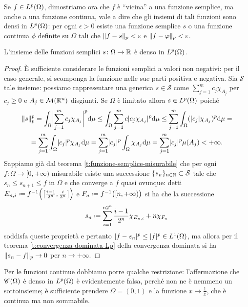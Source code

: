 Se $f\in\leb[p]{\Omega}$, dimostriamo ora che $f$ è ``vicina'' a una funzione semplice, ma anche a una funzione continua, vale a dire che gli insiemi di tali funzioni sono densi in $\leb[p]{\Omega}$: per ogni $\epsilon>0$ esiste una funzione semplice $s$ o una funzione continua $\phi$ definite su $\Omega$ tali che $\norm{f-s}_p<\epsilon$ e $\norm{f-\phi}_p<\epsilon$.
\begin{teorema} \label{t:funzioni-semplici-dense}
    L'insieme delle funzioni semplici $s\colon\Omega\to\R$ è denso in $\leb[p]{\Omega}$.
\end{teorema}
\begin{proof}
    È sufficiente considerare le funzioni semplici a valori non negativi: per il caso generale, si scomponga la funzione nelle sue parti positiva e negativa.
    Sia $\mathcal{S}$ tale insieme: possiamo rappresentare una generica $s\in\mathcal{S}$ come $\sum_{j=1}^mc_j\chi_{A_j}$ per $c_j\ge 0$ e $A_j\in\mis(\R^n)$ disgiunti.
    Se $\Omega$ è limitato allora $s\in\leb[p]{\Omega}$ poich\'e
    \begin{multline}
        \norm{s}_p^p=
        \int_\Omega\abs[\bigg]{\sum_{j=1}^mc_j\chi_{A_j}}^p\dd\mu\le
        \int_\Omega\sum_{j=1}^mc\abs{c_j\chi_{A_j}}^p\dd\mu\le
        \sum_{j=1}^m\int_\Omega(\abs{c_j}\chi_{A_j})^p\dd\mu=\\=
        \sum_{j=1}^m\int_\Omega\abs{c_j}^p\chi_{A_j}\dd\mu=
        \sum_{j=1}^m\abs{c_j}^p\int_\Omega\chi_{A_j}\dd\mu=
        \sum_{j=1}^m\abs{c_j}^p\mu(A_j)<
        +\infty.
    \end{multline}
    Sappiamo già dal teorema \ref{t:funzione-semplice-misurabile} che per ogni $f\colon\Omega\to[0,+\infty)$ misurabile esiste una successione $\{s_n\}_{n\in\N}\subset\mathcal{S}$ tale che $s_n\le s_{n+1}\le f$ in $\Omega$ e che converge a $f$ quasi ovunque: detti $E_{n,i}\defeq f^{-1}\Bigl(\bigl[\frac{i-1}{2^n},\frac{i}{2^n}\bigr]\Bigr)$ e $F_n\defeq f^{-1}\bigl([n,+\infty)\bigr)$ si ha che la successione
        \begin{equation}
            s_n\defeq\sum_{i=1}^{n2^n}\frac{i-1}{2^n}\chi_{E_{n,i}}+n\chi_{F_n}
        \end{equation}
        soddisfa queste proprietà e pertanto $\abs{f-s_n}^p\le\abs{f}^p\in\leb[1]{\Omega}$, ma allora per il teorema \ref{t:convergenza-dominata-Lp} della convergenza dominata si ha $\norm{s_n-f}_p\to 0$ per $n\to+\infty$.
\end{proof}
Per le funzioni continue dobbiamo porre qualche restrizione: l'affermazione che $\cont{\Omega}$ è denso in $\leb[p]{\Omega}$ è evidentemente falsa, perch\'e non ne è nemmeno un sottoinsieme; è sufficiente prendere $\Omega=(0,1)$ e la funzione $x\mapsto\frac1{x}$, che è continua ma non sommabile.
